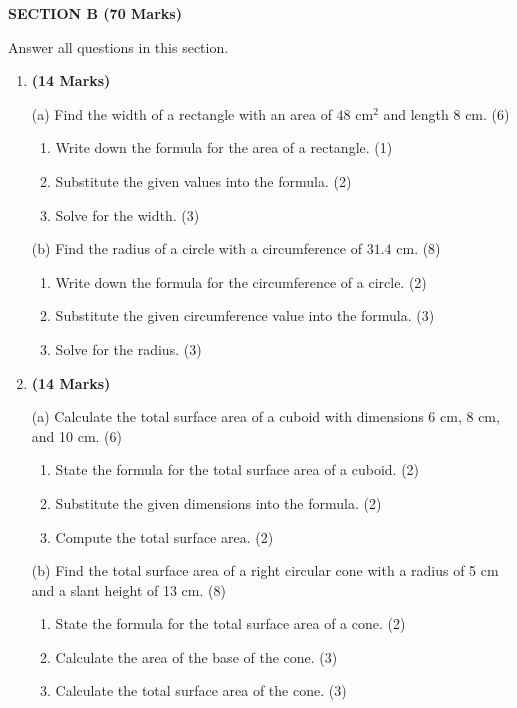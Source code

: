 \documentclass[12pt]{article}
\newcommand{\centerheading}[1]{
    \vspace{0.6em}
    \begin{center}
        {\fontsize{13}{15}\selectfont\bfseries #1}
    \end{center}
    \vspace{0.15em}
}
\newenvironment{questionblock}[1][10]{
    \par\Needspace{#1\baselineskip}
}{
    \par
}
\begin{document}
\centerheading{SECTION B (70 Marks)}
\vspace{-2.0em}
\begin{center}
  Answer all questions in this section.
\end{center}
\vspace{-2.0em}

\begin{enumerate}[start=3]
  \begin{questionblock}[15]
    \item \textbf{(14 Marks)}

    (a) Find the width of a rectangle with an area of $48 \text{ cm}^2$ and length $8 \text{ cm}$. (6)
    \begin{enumerate}[label=(\roman*)]
      \item Write down the formula for the area of a rectangle. (1)
      \item Substitute the given values into the formula. (2)
      \item Solve for the width. (3)
    \end{enumerate}

    (b) Find the radius of a circle with a circumference of $31.4 \text{ cm}$. (8)
    \begin{enumerate}[label=(\roman*)]
      \item Write down the formula for the circumference of a circle. (2)
      \item Substitute the given circumference value into the formula. (3)
      \item Solve for the radius. (3)
    \end{enumerate}
  \end{questionblock}

  \begin{questionblock}[15]
    \item \textbf{(14 Marks)}

    (a) Calculate the total surface area of a cuboid with dimensions 6 cm, 8 cm, and 10 cm. (6)
    \begin{enumerate}[label=(\roman*)]
      \item State the formula for the total surface area of a cuboid. (2)
      \item Substitute the given dimensions into the formula. (2)
      \item Compute the total surface area. (2)
    \end{enumerate}

    (b) Find the total surface area of a right circular cone with a radius of 5 cm and a slant height of 13 cm. (8)
    \begin{enumerate}[label=(\roman*)]
      \item State the formula for the total surface area of a cone. (2)
      \item Calculate the area of the base of the cone. (3)
      \item Calculate the total surface area of the cone. (3)
    \end{enumerate}
  \end{questionblock}


\end{enumerate}
\end{document}
